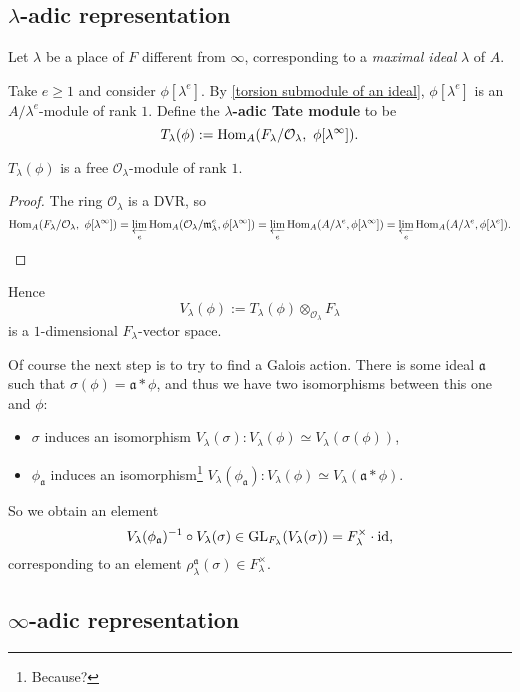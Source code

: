 \documentclass{article}
\renewcommand{\O}{\mathcal{O}}
\newcommand{\m}{\mathfrak{m}}
\begin{document}
\subsection{\texorpdfstring{$\lambda$}{lambda}-adic representation}
Let $\lambda$ be a place of $F$ different from $\infty$, corresponding to a \textit{maximal ideal} $\lambda$ of $A$.

Take $e\ge 1$ and consider $\phi[\lambda^e]$.
By \cref{torsion submodule of an ideal},
$\phi[\lambda^e]$ is an $A/\lambda^e$-module of rank $1$.
Define the \textbf{$\lambda$-adic Tate module} to be\[T_\lambda(\phi) := \Hom_A(F_\lambda/\O_\lambda,\ \phi[\lambda^\infty]).\]
\begin{proposition}
    $T_\lambda(\phi)$ is a free $\O_\lambda$-module of rank $1$.
\end{proposition}
\begin{proof}
    The ring $\O_\lambda$ is a DVR, so
    \[
        \Hom_A(F_\lambda/\O_\lambda,\ \phi[\lambda^\infty])
        = \varprojlim_e \Hom_A(\O_\lambda/\m_\lambda^e, \phi[\lambda^\infty])
        = \varprojlim_e \Hom_A(A/\lambda^e, \phi[\lambda^\infty])
        = \varprojlim_e \Hom_A(A/\lambda^e, \phi[\lambda^e]).\qedhere
    \]
\end{proof}

Hence \[V_\lambda(\phi) := T_\lambda(\phi)\otimes_{\O_\lambda} F_\lambda\] is a $1$-dimensional $F_\lambda$-vector space.

Of course the next step is to try to find a Galois action.
There is some ideal $\mathfrak{a}$ such that $\sigma(\phi) = \mathfrak{a}*\phi$,
and thus we have two isomorphisms between this one and $\phi$:
\begin{itemize}
    \item $\sigma$ induces an isomorphism $V_\lambda(\sigma) : V_\lambda(\phi)\simeq V_\lambda(\sigma(\phi))$,
    \item $\phi_\mathfrak{a}$ induces an isomorphism\footnote{
        Because?
    } $V_\lambda(\phi_\mathfrak{a}) : V_\lambda(\phi)\simeq V_\lambda(\mathfrak{a}*\phi)$.
\end{itemize}
So we obtain an element \[V_\lambda(\phi_\mathfrak{a})^{-1}\circ V_\lambda(\sigma)\in\operatorname{GL}_{F_\lambda}(V_\lambda(\sigma)) = F_\lambda^\times\cdot\operatorname{id},\]
corresponding to an element $\rho_\lambda^\mathfrak{a}(\sigma)\in F_\lambda^\times$.






\subsection{\texorpdfstring{$\infty$}{infty}-adic representation}
\end{document}
